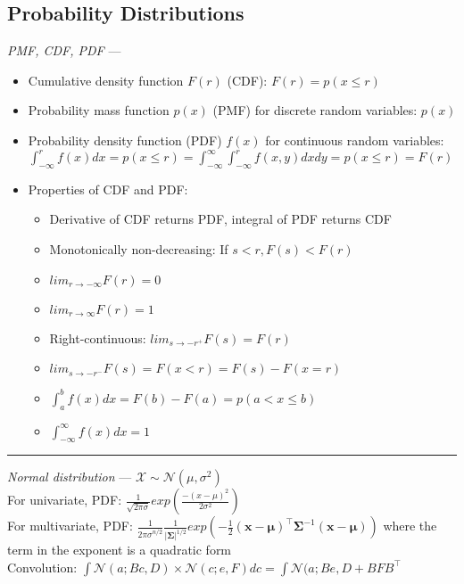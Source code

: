 \subsection*{Probability Distributions}
\emph{PMF, CDF, PDF} --- 
\begin{itemize}
    \item Cumulative density function $F(r)$ (CDF): $F(r) = p(x \leq r)$
    \item Probability mass function $p(x)$ (PMF) for discrete random variables: $p(x)$
    \item Probability density function (PDF) $f(x)$ for continuous random variables: $\int_{-\infty}^r f(x)dx = p(x \leq r) = \int_{-\infty}^{\infty} \int_{-\infty}^r f(x,y) dx dy = p(x \leq r) = F(r)$
    \item Properties of CDF and PDF:
    \begin{itemize}
        \item Derivative of CDF returns PDF, integral of PDF returns CDF
        \item Monotonically non-decreasing: If $s<r, F(s) < F(r)$
        \item $lim_{r\rightarrow-\infty} F(r) = 0$
        \item $lim_{r\rightarrow\infty} F(r) = 1$
        \item Right-continuous: $lim_{s\rightarrow-r^+} F(s) = F(r)$
        \item $lim_{s\rightarrow-r^-} F(s) = F(x < r) = F(s) - F(x = r)$
        \item $\int_a^b f(x)dx = F(b)-F(a) = p(a < x \leq b)$
        \item $\int_{-\infty}^\infty f(x)dx = 1$
    \end{itemize}
\end{itemize}

{\color{lightgray}\hrule height 0.001mm}

\emph{Normal distribution} --- 
$\mathcal{X} \sim \mathcal{N}(\mu, \sigma^2)$\\
For univariate, PDF: $\frac{1}{\sqrt{2\pi\sigma}} exp(\frac{-(x-\mu)^2}{2\sigma^2})$\\
For multivariate, PDF: $\frac{1}{{2\pi\sigma}^{n/2}} \frac{1}{|\boldsymbol{\Sigma}|^{1/2}} exp(-\frac{1}{2} (\boldsymbol{x}-\boldsymbol{\mu})^\intercal \boldsymbol{\Sigma}^{-1} (\boldsymbol{x}-\boldsymbol{\mu}))$ where the term in the exponent is a quadratic form\\
Convolution: $\int \mathcal{N}(a;Bc,D) \times \mathcal{N}(c;e,F) dc = \int \mathcal{N}(a;Be,D + BFB^\intercal$

